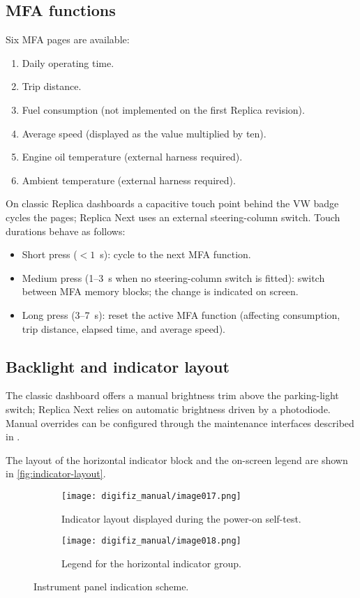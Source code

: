 \subsection{MFA functions}
Six MFA pages are available:
\begin{enumerate}
    \item Daily operating time.
    \item Trip distance.
    \item Fuel consumption (not implemented on the first Replica revision).
    \item Average speed (displayed as the value multiplied by ten).
    \item Engine oil temperature (external harness required).
    \item Ambient temperature (external harness required).
\end{enumerate}
On classic Replica dashboards a capacitive touch point behind the VW badge cycles the pages; Replica Next uses an external steering-column switch. Touch durations behave as follows:
\begin{itemize}
    \item Short press (\(<1\)~s): cycle to the next MFA function.
    \item Medium press (1--3~s when no steering-column switch is fitted): switch between MFA memory blocks; the change is indicated on screen.
    \item Long press (3--7~s): reset the active MFA function (affecting consumption, trip distance, elapsed time, and average speed).
\end{itemize}

\subsection{Backlight and indicator layout}
The classic dashboard offers a manual brightness trim above the parking-light switch; Replica Next relies on automatic brightness driven by a photodiode. Manual overrides can be configured through the maintenance interfaces described in .

The layout of the horizontal indicator block and the on-screen legend are shown in \autoref{fig:indicator-layout}.

\begin{figure}[htbp]
    \centering
    \begin{subfigure}{0.48\textwidth}
        \texttt{[image: digifiz\_manual/image017.png]}
        \caption{Indicator layout displayed during the power-on self-test.}
    \end{subfigure}\hfill
    \begin{subfigure}{0.48\textwidth}
        \texttt{[image: digifiz\_manual/image018.png]}
        \caption{Legend for the horizontal indicator group.}
    \end{subfigure}
    \caption{Instrument panel indication scheme.}
    \label{fig:indicator-layout}
\end{figure}

